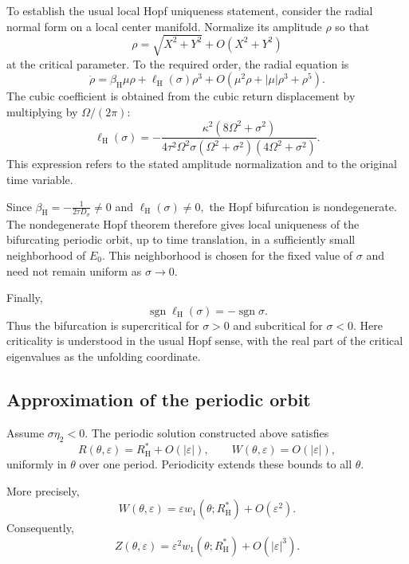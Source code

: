 \documentclass[11pt,reqno]{amsart}
\theoremstyle{plain}
\theoremstyle{definition}
\theoremstyle{remark}
\begin{document}
To establish the usual local Hopf uniqueness statement,
consider the radial normal form on a local center
manifold. Normalize its amplitude $\rho$ so that
\[
\rho=\sqrt{X^2+Y^2}
+O(X^2+Y^2)
\]
at the critical parameter. To the required order, the
radial equation is
\[
\dot\rho
=
\beta_{\mathrm H}\mu\rho
+\ell_{\mathrm H}(\sigma)\rho^3
+O\left(\mu^2\rho+|\mu|\rho^3+\rho^5\right).
\]
The cubic coefficient is obtained from the cubic return
displacement by multiplying by $\Omega/(2\pi)$:
\[
\ell_{\mathrm H}(\sigma)
=
-\frac{\kappa^2(8\Omega^2+\sigma^2)}
{4\tau^2\Omega^2\sigma
(\Omega^2+\sigma^2)(4\Omega^2+\sigma^2)}.
\]
This expression refers to the stated amplitude
normalization and to the original time variable.

Since
$
\beta_{\mathrm H}=-\frac1{2\tau D_\sigma}\neq0$
and
$\ell_{\mathrm H}(\sigma)\neq0,
$
the Hopf bifurcation is nondegenerate. The nondegenerate
Hopf theorem therefore gives local uniqueness of the
bifurcating periodic orbit, up to time translation, in a
sufficiently small neighborhood of $E_0$. This neighborhood
is chosen for the fixed value of $\sigma$ and need not
remain uniform as $\sigma\to0$.

Finally,
\[
\operatorname{sgn}\ell_{\mathrm H}(\sigma)
=
-\operatorname{sgn}\sigma.
\]
Thus the bifurcation is supercritical for $\sigma>0$
and subcritical for $\sigma<0$. Here criticality is
understood in the usual Hopf sense, with the real part
of the critical eigenvalues as the unfolding coordinate.

\subsection{Approximation of the periodic orbit}
\label{subsec:classical-Hopf-periodic-orbit}

Assume $\sigma\eta_2<0$. The periodic solution constructed
above satisfies
\begin{equation}
\label{eq:classical-Hopf-RW-leading}
R(\theta,\varepsilon)
=
R_{\mathrm H}^*+O(|\varepsilon|),
\qquad
W(\theta,\varepsilon)=O(|\varepsilon|),
\end{equation}
uniformly in $\theta$ over one period. Periodicity extends
these bounds to all $\theta$.

More precisely,
\[
W(\theta,\varepsilon)
=
\varepsilon w_1(\theta;R_{\mathrm H}^*)
+O(\varepsilon^2).
\]
Consequently,
\[
Z(\theta,\varepsilon)
=
\varepsilon^2w_1(\theta;R_{\mathrm H}^*)
+O(|\varepsilon|^3).
\]
\end{document}
